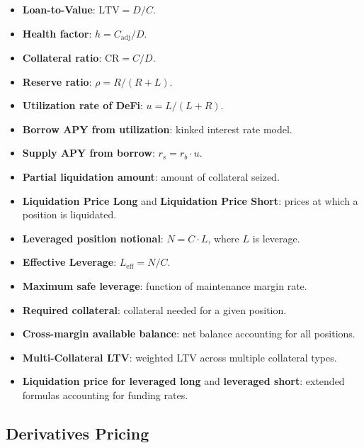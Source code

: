 \documentclass[twoside,11pt]{article}
\begin{document}
\begin{itemize}
  \item \textbf{Loan-to-Value}: $\mathrm{LTV} = D/C$.
  \item \textbf{Health factor}: $h = C_{\mathrm{adj}} / D$.
  \item \textbf{Collateral ratio}: $\mathrm{CR} = C/D$.
  \item \textbf{Reserve ratio}: $\rho = R / (R + L)$.
  \item \textbf{Utilization rate of DeFi}: $u = L / (L + R)$.
  \item \textbf{Borrow APY from utilization}: kinked interest rate model.
  \item \textbf{Supply APY from borrow}: $r_s = r_b \cdot u$.
  \item \textbf{Partial liquidation amount}: amount of collateral seized.
  \item \textbf{Liquidation Price Long} and \textbf{Liquidation Price Short}:
    prices at which a position is liquidated.
  \item \textbf{Leveraged position notional}: $N = C \cdot L$, where $L$ is leverage.
  \item \textbf{Effective Leverage}: $L_{\mathrm{eff}} = N/C$.
  \item \textbf{Maximum safe leverage}: function of maintenance margin rate.
  \item \textbf{Required collateral}: collateral needed for a given position.
  \item \textbf{Cross-margin available balance}: net balance accounting for all positions.
  \item \textbf{Multi-Collateral LTV}: weighted LTV across multiple collateral types.
  \item \textbf{Liquidation price for leveraged long} and \textbf{leveraged short}:
    extended formulas accounting for funding rates.
\end{itemize}

\subsection{Derivatives Pricing}
\label{sec:bench_derivatives}
\end{document}
